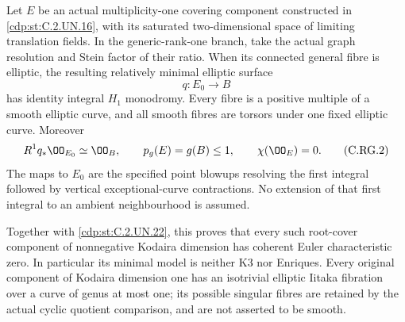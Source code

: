 
\begin{proposition}\label{cdp:st:C.2.UN.29}
Let $E$ be an actual multiplicity-one covering component
constructed in \ref{cdp:st:C.2.UN.16}, with its saturated two-dimensional
space of limiting translation fields. In the generic-rank-one
branch, take the actual graph resolution and Stein factor
of their ratio. When its connected general fibre is elliptic,
the resulting relatively minimal elliptic surface
\[
                         q:E_0\longrightarrow B
                                                               \tag{C.RG.1}\label{cdp:eq:C.RG.1}
\]
has identity integral $H_1$ monodromy. Every fibre is a
positive multiple of a smooth elliptic curve, and all smooth
fibres are torsors under one fixed elliptic curve. Moreover
\[
 R^1q_*\OO_{E_0}\simeq\OO_B,\qquad
 p_g(E)=g(B)\le1,\qquad \chi(\OO_E)=0.
                                                               \tag{C.RG.2}\label{cdp:eq:C.RG.2}
\]
The maps to $E_0$ are the specified point blowups resolving
the first integral followed by vertical exceptional-curve
contractions. No extension of that first integral to an
ambient neighbourhood is assumed.

Together with \ref{cdp:st:C.2.UN.22}, this proves that every such root-cover
component of nonnegative Kodaira dimension has coherent
Euler characteristic zero. In particular its minimal model
is neither K3 nor Enriques. Every original component of
Kodaira dimension one has an isotrivial elliptic Iitaka
fibration over a curve of genus at most one; its possible
singular fibres are retained by the actual cyclic quotient
comparison, and are not asserted to be smooth.
\end{proposition}
